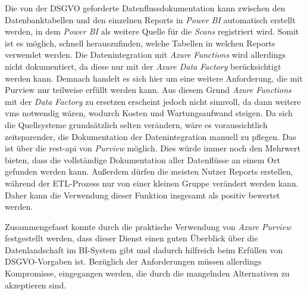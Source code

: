 Die von der DSGVO geforderte Datenflussdokumentation kann zwischen den Datenbanktabellen und den einzelnen Reports in \textit{Power BI} automatisch erstellt werden, in dem \textit{Power BI} als weitere Quelle für die \textit{Scans} registriert wird. Somit ist es möglich, schnell herauszufinden, welche Tabellen in welchen Reports verwendet werden. Die Datenintegration mit \textit{Azure Functions} wird allerdings nicht dokumentiert, da diese nur mit der \textit{Azure Data Factory} berücksichtigt werden kann. Demnach handelt es sich hier um eine weitere Anforderung, die mit Purview nur teilweise erfüllt werden kann. Aus diesem Grund \textit{Azure Functions} mit der \textit{Data Factory} zu ersetzen erscheint jedoch nicht sinnvoll, da dann weitere \acp{vm} notwendig wären, wodurch Kosten und Wartungsaufwand steigen. Da sich die Quellsysteme grundsätzlich selten verändern, wäre es voraussichtlich zeitsparender, die Dokumentation der Datenintegration manuell zu pflegen. Das ist über die \ac{rest}-\ac{api} von \textit{Purview} möglich. Dies würde immer noch den Mehrwert bieten, dass die vollständige Dokumentation aller Datenflüsse an einem Ort gefunden werden kann. Außerdem dürfen die meisten Nutzer Reports erstellen, während der ETL-Prozess nur von einer kleinen Gruppe verändert werden kann. Daher kann die Verwendung dieser Funktion insgesamt als positiv bewertet werden. 

\cite[vgl.][]{lesteve_definitive_2021, msdoc_22_purview_sensLabel, riscutia_data_2021, borosch_cloud_2021}

Zusammengefasst konnte durch die praktische Verwendung von \textit{Azure Purview} festgestellt werden, dass dieser Dienst einen guten Überblick über die Datenlandschaft im BI-System gibt und dadurch hilfreich beim Erfüllen von DSGVO-Vorgaben ist. Bezüglich der Anforderungen müssen allerdings Kompromisse, eingegangen werden, die durch die mangelnden Alternativen zu akzeptieren sind.